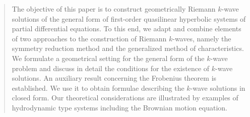 \documentclass{birkjour}
\theoremstyle{definition}
\theoremstyle{remark}
\numberwithin{equation}{section}
\numberwithin{equation}{section}
\numberwithin{thm}{section}
\numberwithin{equation}{section}
\numberwithin{thm}{section}
\begin{document}





\begin{abstract}
	The objective of this paper is to construct geometrically Riemann $k$-wave solutions of the general form of first-order quasilinear hyperbolic systems of partial differential equations. To this end, we adapt and combine elements of two approaches to the construction of Riemann $k$-waves, namely the symmetry reduction method and the generalized method of characteristics. We formulate a geometrical setting for the general form of the $k$-wave problem and discuss in detail the  conditions for the existence of $k$-wave solutions. An auxiliary result concerning the Frobenius theorem is established. We use it to obtain formulae describing the $k$-wave solutions in closed form. Our theoretical considerations are illustrated by examples of hydrodynamic type systems including the Brownian motion equation.
\end{abstract}
\maketitle
\end{document}
